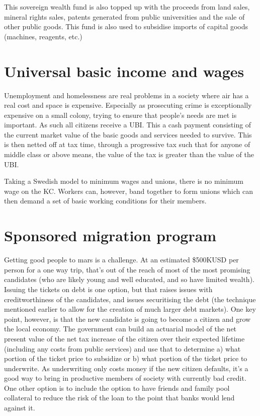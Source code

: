 \documentclass[10pt]{article}
\begin{document}
This sovereign wealth fund is also topped up with the proceeds from land sales, mineral rights sales, patents generated from public universities and the sale of other public goods. This fund is also used to subsidise imports of capital goods (machines, reagents, etc.)

\section{Universal basic income and wages}
Unemployment and homelessness are real problems in a society where air has a real cost and space is expensive. Especially as prosecuting crime is exceptionally expensive on a small colony, trying to ensure that people's needs are met is important. As such all citizens receive a UBI. This a cash payment consisting of the current market value of the basic goods and services needed to survive. This is then netted off at tax time, through a progressive tax such that for anyone of middle class or above means, the value of the tax is greater than the value of the UBI. 

Taking a Swedish model to minimum wages and unions, there is no minimum wage on the KC. Workers can, however, band together to form unions which can then demand a set of basic working conditions for their members.

\section{Sponsored migration program}
Getting good people to mars is a challenge. At an estimated \$500KUSD per person for a one way trip, that's out of the reach of most of the most promising candidates (who are likely young and well educated, and so have limited wealth). Issuing the tickets on debt is one option, but that raises issues with creditworthiness of the candidates, and issues securitising the debt (the technique mentioned earlier to allow for the creation of much larger debt markets). One key point, however, is that the new candidate is going to become a citizen and grow the local economy. The government can build an actuarial model of the net present value of the net tax increase of the citizen over their expected lifetime (including any costs from public services) and use that to determine a) what portion of the ticket price to subsidize or b) what portion of the ticket price to underwrite. As underwriting only costs money if the new citizen defaults, it's a good way to bring in productive members of society with currently bad credit. One other option is to include the option to have friends and family pool collateral to reduce the risk of the loan to the point that banks would lend against it.
\end{document}
